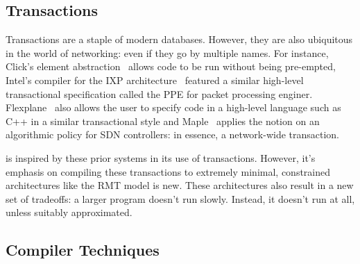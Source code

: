 


\subsection{Transactions}
Transactions are a staple of modern databases. However, they are also
ubiquitous in the world of networking: even if they go by multiple names. For
instance, Click's element abstraction~\cite{click} allows code to be run
without being pre-empted, Intel's compiler for the IXP
architecture~\cite{intel} featured a similar high-level transactional
specification called the PPE for packet processing enginer.
Flexplane~\cite{flexplane} also allows the user to specify code in a high-level
language such as C++ in a similar transactional style and Maple~\cite{maple}
applies the notion on an algorithmic policy for SDN controllers: in essence,
a network-wide transaction.

 \pktlanguage{} is inspired by these prior systems in its use of transactions.
However, it's emphasis on compiling these transactions to extremely minimal,
constrained architectures like the RMT model is new. These architectures also
result in a new set of tradeoffs: a larger program doesn't run slowly. Instead,
it doesn't run at all, unless suitably approximated.

\subsection{Compiler Techniques}

